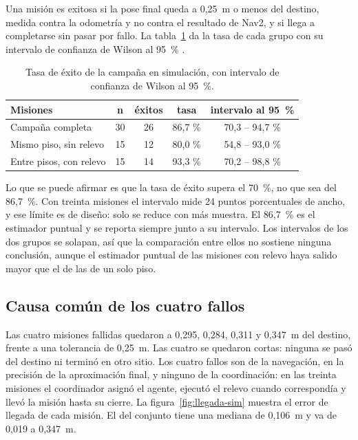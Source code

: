 Una misión es exitosa si la pose final queda a 0,25~m o menos del destino,
medida contra la odometría y no contra el resultado de Nav2, y si llega a
completarse sin pasar por fallo. La tabla~\ref{tab:exito} da la tasa de cada grupo
con su intervalo de confianza de Wilson al 95~\% \autocite{wilson1927probable}.

\begin{table}[htbp]
  \caption{Tasa de éxito de la campaña en simulación, con intervalo de confianza
    de Wilson al 95~\%.}
  \label{tab:exito}
  \begin{tabular}{@{}lcccc@{}}
    \toprule
    \textbf{Misiones} & \textbf{n} & \textbf{éxitos} & \textbf{tasa} & \textbf{intervalo al 95~\%} \\ \midrule
    Campaña completa & 30 & 26 & 86,7 \% & 70,3 -- 94,7 \% \\
    Mismo piso, sin relevo & 15 & 12 & 80,0 \% & 54,8 -- 93,0 \% \\
    Entre pisos, con relevo & 15 & 14 & 93,3 \% & 70,2 -- 98,8 \% \\ \bottomrule
  \end{tabular}
\end{table}

Lo que se puede afirmar es que la tasa de éxito supera el 70~\%, no que sea del 86,7~\%. Con treinta misiones el intervalo mide 24 puntos porcentuales de ancho, y
ese límite es de diseño: solo se reduce con más muestra. El 86,7~\% es el
estimador puntual y se reporta siempre junto a su intervalo. Los intervalos de
los dos grupos se solapan, así que la comparación entre ellos no sostiene ninguna conclusión, aunque el estimador puntual de las misiones con relevo haya salido mayor que el de las de un solo piso.

\subsection{Causa común de los cuatro fallos}

Las cuatro misiones fallidas quedaron a 0,295, 0,284, 0,311 y 0,347~m del
destino, frente a una tolerancia de 0,25~m. Las cuatro se quedaron cortas:
ninguna se pasó del destino ni terminó en otro sitio. Los cuatro fallos son de la navegación, en la precisión de la aproximación final, y ninguno de la coordinación: en las treinta misiones el coordinador asignó el agente, ejecutó el relevo cuando correspondía y llevó la misión hasta su cierre. La figura~\ref{fig:llegada-sim} muestra el error de llegada de cada misión. El del conjunto tiene una mediana de 0,106~m y va de 0,019 a 0,347~m.

